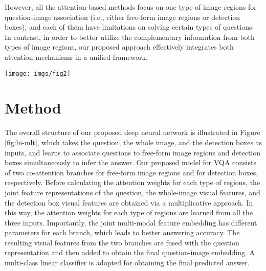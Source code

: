 \documentclass[letterpaper]{article}
\begin{document}
However, all the attention-based methods focus on one type of image regions for question-image association (i.e., either free-form image regions or detection boxes), and each of them have limitations on solving certain types of questions. In contrast, in order to better utilize the complementary information from both types of image regions, our proposed approach effectively integrates both attention mechanisms in a unified framework.



\begin{figure*}[ht!]
	\centering
	\texttt{[image: imgs/fig2]}
	\caption{Illustration of the overall network structure for solving the VQA task. The network has two attention branches with the proposed multiplicative featucre embedding scheme, where one branch attends free-form image regions and another branch attends detection boxes for encoding question-related visual features.}
	\label{fig:bi-mlt}
\end{figure*}












\section{Method}

The overall structure of our proposed deep neural network is illustrated in Figure \ref{fig:bi-mlt}, which takes the question, the whole image, and the detection boxes as inputs, and learns to associate questions to free-form image regions and detection boxes simultaneously to infer the answer. 
Our proposed model for VQA consists of two co-attention branches for free-form image regions and for detection boxes, respectively. Before calculating the attention weights for each type of regions, the joint feature representations of the question, the whole-image visual features, and the detection box visual features are obtained via a multiplicative approach. In this way, the attention weights for each type of regions are learned from all the three inputs. Importantly, the joint multi-modal feature embedding has different parameters for each branch, which leads to better answering accuracy. The resulting visual features from the two branches are fused with the question representation and then added to obtain the final question-image embedding. A multi-class linear classifier is adopted for obtaining the final predicted answer.
\end{document}

